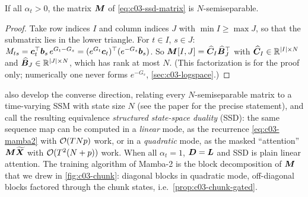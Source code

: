 \begin{proposition}\label{prop:c03-semisep}
If all $\alpha_t>0$, the matrix $\bm{M}$ of \cref{eq:c03-ssd-matrix} is $N$-semiseparable.
\end{proposition}

\begin{proof}
Take row indices $I$ and column indices $J$ with $\min I\ge\max J$, so that the submatrix lies in
the lower triangle. For $t\in I$, $s\in J$:
$M_{ts}=\bm{c}_t^{\top}\bm{b}_s\,e^{G_t-G_s}=(e^{G_t}\bm{c}_t)^{\top}(e^{-G_s}\bm{b}_s)$. So
$\bm{M}[I,J]=\widehat{\bm{C}}_I\widehat{\bm{B}}_J^{\top}$ with $\widehat{\bm{C}}_I\in\mathbb{R}^{\left\lvert I\right\rvert\times N}$ and
$\widehat{\bm{B}}_J\in\mathbb{R}^{\left\lvert J\right\rvert\times N}$, which has rank at most $N$. (This factorization is for
the proof only; numerically one never forms $e^{-G_s}$, \cref{sec:c03-logspace}.)
\end{proof}

\citet{dao2024ssd} also develop the converse direction, relating every $N$-semiseparable matrix
to a time-varying SSM with state size $N$ (see the paper for the precise statement), and call the
resulting equivalence \emph{structured state-space duality} (SSD): the same sequence map can be computed in a \emph{linear} mode, as the recurrence
\cref{eq:c03-mamba2} with $\mathcal{O}(TNp)$ work, or in a \emph{quadratic} mode, as the masked
``attention'' $\bm{M}\widetilde{\bm{X}}$ with $\mathcal{O}(T^2(N+p))$ work. When all $\alpha_t=1$, $\bm{D}=\bm{L}$
and SSD is plain linear attention. The training algorithm of Mamba-2 is the block decomposition
of $\bm{M}$ that we drew in \cref{fig:c03-chunk}: diagonal blocks in quadratic mode, off-diagonal
blocks factored through the chunk states, i.e.\ \cref{prop:c03-chunk-gated}.

